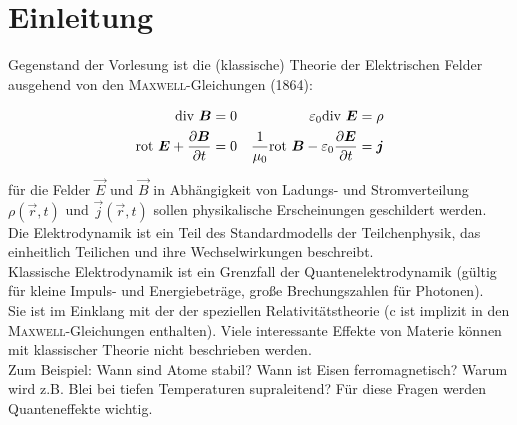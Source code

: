 \chapter{Einleitung}
Gegenstand der Vorlesung ist die (klassische) Theorie der Elektrischen Felder ausgehend von den \textsc{Maxwell}-Gleichungen (1864):

\begin{align*}
\text{div } \bm{B}&=0 &\varepsilon_0\text{div } \bm{E}&=\rho\\
\text{rot }  \bm{E}+\frac{\partial{\bm{B}}}{\partial{t}}&=0 &\frac{1}{\mu_0}\text{rot } \bm{B}-\varepsilon_0\frac{\partial{\bm{E}}}{\partial{t}}&=\bm{j}
\end{align*}


für die Felder $\vec{E}$ und $\vec{B}$ in Abhängigkeit von Ladungs- und Stromverteilung $\rho(\vec{r},t)$ und $\vec{j}(\vec{r},t)$  sollen physikalische Erscheinungen geschildert werden.\\
Die Elektrodynamik ist ein Teil des Standardmodells der Teilchenphysik, das einheitlich Teilichen und ihre Wechselwirkungen beschreibt.\\
Klassische Elektrodynamik ist ein Grenzfall der Quantenelektrodynamik (gültig für kleine Impuls- und Energiebeträge, große Brechungszahlen für Photonen).\\
Sie ist im Einklang mit der der speziellen Relativitätstheorie (c ist implizit in den \textsc{Maxwell}-Gleichungen enthalten). Viele interessante Effekte von Materie können mit klassischer Theorie nicht beschrieben werden.\\
Zum Beispiel: Wann sind Atome stabil? Wann ist Eisen ferromagnetisch? Warum wird z.B. Blei bei tiefen Temperaturen supraleitend? Für diese Fragen werden Quanteneffekte wichtig.